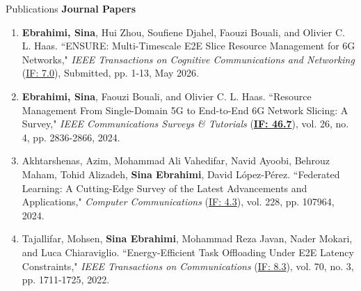 \documentclass{resume}
\begin{document}
\begin{rSection}{Publications}
	\textbf{Journal Papers}
        \setcounter{revnum}{4} %
	\begin{enumerate}[label=\arabic{revnum}., left=-4.5mm] %
          \item  \textbf{Ebrahimi, Sina}, Hui Zhou, Soufiene Djahel, Faouzi Bouali, and Olivier C. L. Haas. ``ENSURE: Multi-Timescale E2E Slice Resource Management for 6G Networks," \textit{IEEE Transactions on Cognitive Communications and Networking} (\underline{IF: 7.0}), Submitted, pp. 1-13, May 2026. \href{https://ieeexplore.ieee.org/xpl/RecentIssue.jsp?punumber=4275028}{} \href{}{}	
          \addtocounter{revnum}{-1} %
          \item  \textbf{Ebrahimi, Sina}, Faouzi Bouali, and Olivier C. L. Haas. ``Resource Management From Single-Domain 5G to End-to-End 6G Network Slicing: A Survey," \textit{IEEE Communications Surveys \& Tutorials} (\underline{\textbf{IF: 46.7}}), vol. 26, no. 4, pp. 2836-2866, 2024. \href{https://ieeexplore.ieee.org/xpl/RecentIssue.jsp?punumber=9739}{} \href{https://doi.org/10.1109/COMST.2024.3390613}{} \href{https://github.com/sinaebrahimi/network_slicing_literature_analysis}{}	
          \addtocounter{revnum}{-1}
          \item  Akhtarshenas, Azim, Mohammad Ali Vahedifar, Navid Ayoobi, Behrouz Maham, Tohid Alizadeh, \textbf{Sina Ebrahimi}, David López-Pérez. ``Federated Learning: A Cutting-Edge Survey of the Latest Advancements and Applications," \textit{Computer Communications} (\underline{IF: 4.3}), vol. 228, pp. 107964, 2024. \href{https://www.sciencedirect.com/journal/computer-communications/about/insights}{} \href{https://doi.org/10.1016/j.comcom.2024.107964}{}	%
          \addtocounter{revnum}{-1}
          \item Tajallifar, Mohsen, \textbf{Sina Ebrahimi}, Mohammad Reza Javan, Nader Mokari, and Luca Chiaraviglio. ``Energy-Efficient Task Offloading Under E2E Latency Constraints," \textit{IEEE Transactions on Communications} (\underline{IF: 8.3}), vol. 70, no. 3, pp. 1711-1725, 2022. \href{https://ieeexplore.ieee.org/xpl/RecentIssue.jsp?punumber=26}{} \href{https://github.com/sinaebrahimi/task-offloading}{} \href{https://doi.org/10.1109/TCOMM.2021.3132909}{}	

\end{enumerate}
\end{rSection}
\end{document}
